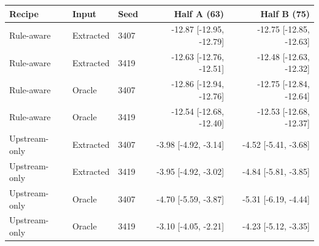 \begin{tabular}{lllrr}
\toprule
Recipe & Input & Seed & Half A (63) & Half B (75) \\
\midrule
Rule-aware & Extracted & 3407 & -12.87 [-12.95, -12.79] & -12.75 [-12.85, -12.63] \\
Rule-aware & Extracted & 3419 & -12.63 [-12.76, -12.51] & -12.48 [-12.63, -12.32] \\
Rule-aware & Oracle & 3407 & -12.86 [-12.94, -12.76] & -12.75 [-12.84, -12.64] \\
Rule-aware & Oracle & 3419 & -12.54 [-12.68, -12.40] & -12.53 [-12.68, -12.37] \\
\midrule
Upstream-only & Extracted & 3407 & -3.98 [-4.92, -3.14] & -4.52 [-5.41, -3.68] \\
Upstream-only & Extracted & 3419 & -3.95 [-4.92, -3.02] & -4.84 [-5.81, -3.85] \\
Upstream-only & Oracle & 3407 & -4.70 [-5.59, -3.87] & -5.31 [-6.19, -4.44] \\
Upstream-only & Oracle & 3419 & -3.10 [-4.05, -2.21] & -4.23 [-5.12, -3.35] \\
\bottomrule
\end{tabular}

